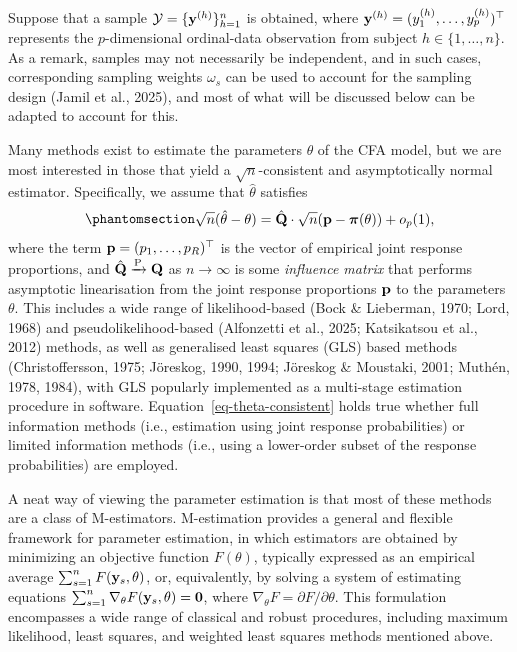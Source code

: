 \documentclass[
  letterpaper,
  DIV=11,
  numbers=noendperiod]{scrartcl}
\begin{document}
Suppose that a sample \(\mathcal Y = \{{\mathbf y}^{(h)}\}_{h=1}^n\) is
obtained, where \({\mathbf y}^{(h)} = (y_1^{(h)},\ldots,y_p^{(h)})^\top\)
represents the \(p\)-dimensional ordinal-data observation from subject
\(h\in\{1,\dots,n\}\). As a remark, samples may not necessarily be
independent, and in such cases, corresponding sampling weights
\(\omega_s\) can be used to account for the sampling design (Jamil et
al., 2025), and most of what will be discussed below can be adapted to
account for this.

Many methods exist to estimate the parameters \(\theta\) of the CFA
model, but we are most interested in those that yield a
\(\sqrt{n}\)-consistent and asymptotically normal estimator.
Specifically, we assume that \(\hat\theta\) satisfies
\begin{equation}\phantomsection\label{eq-theta-consistent}{
\begin{aligned}
\sqrt{n}(\hat\theta - \theta) = \hat\bQ \cdot \sqrt{n}(\bp - \bpi(\theta)) + o_p(1),
\end{aligned}
}\end{equation} where the term \({\mathbf p} = (p_1,\ldots,p_R)^\top\) is the
vector of empirical joint response proportions, and
\(\hat{{\mathbf Q}} \xrightarrow{\text P} {\mathbf Q}\) as \(n\to\infty\) is some
\emph{influence matrix} that performs asymptotic linearisation from the
joint response proportions \({\mathbf p}\) to the parameters \(\theta\). This
includes a wide range of likelihood-based (Bock \& Lieberman, 1970;
Lord, 1968) and pseudolikelihood-based (Alfonzetti et al., 2025;
Katsikatsou et al., 2012) methods, as well as generalised least squares
(GLS) based methods (Christoffersson, 1975; Jöreskog, 1990, 1994;
Jöreskog \& Moustaki, 2001; Muthén, 1978, 1984), with GLS popularly
implemented as a multi-stage estimation procedure in software.
Equation~\ref{eq-theta-consistent} holds true whether full information
methods (i.e., estimation using joint response probabilities) or limited
information methods (i.e., using a lower-order subset of the response
probabilities) are employed.

A neat way of viewing the parameter estimation is that most of these
methods are a class of M-estimators. M-estimation provides a general and
flexible framework for parameter estimation, in which estimators are
obtained by minimizing an objective function \(F(\theta)\), typically
expressed as an empirical average \(\sum_{s=1}^n F({\mathbf y}_s, \theta)\), or,
equivalently, by solving a system of estimating equations
\(\sum_{s=1}^n \nabla_\theta F({\mathbf y}_s, \theta) = {\mathbf 0}\), where
\(\nabla_\theta F = \partial F / \partial \theta\). This formulation
encompasses a wide range of classical and robust procedures, including
maximum likelihood, least squares, and weighted least squares methods
mentioned above.
\end{document}

